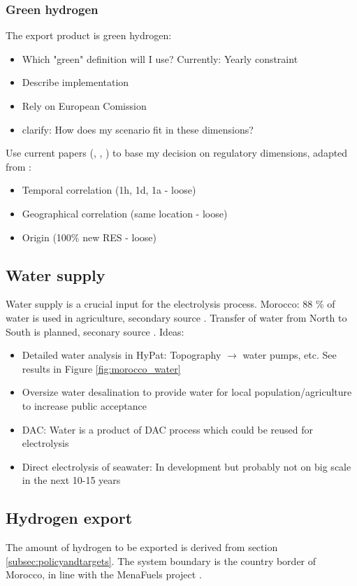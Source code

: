 \subsubsection{Green hydrogen}
The export product is green hydrogen:
\begin{itemize}
    \item Which "green" definition will I use? Currently: Yearly constraint
    \item Describe implementation
    \item Rely on European Comission
    \item clarify: How does my scenario fit in these dimensions?
\end{itemize}

Use current papers (\cite{Brauer2022}, \cite{Ruhnau2022}, \cite{Zeyen2022}) to base my decision on
regulatory dimensions, adapted from \cite{Brauer2022}:
\begin{itemize}
    \item Temporal correlation (1h, 1d, 1a - loose) 
    \item Geographical correlation (same location - loose)
    \item Origin (100\% new RES - loose)
\end{itemize}


\subsection{Water supply}
\label{subsec:water_supply}
Water supply is a crucial input for the electrolysis process. 
Morocco: 88 \% of water is used in agriculture, secondary source \cite{Ersoy2022}.
Transfer of water from North to South is planned, seconary source \cite{Ersoy2022}.
Ideas:
\begin{itemize}
    \item Detailed water analysis in HyPat: Topography $\rightarrow$ water pumps, etc. See results in Figure \ref{fig:morocco_water}
    \item Oversize water desalination to provide water for local population/agriculture to increase public acceptance
    \item DAC: Water is a product of DAC process which could be reused for electrolysis
    \item Direct electrolysis of seawater: In development but probably not on big scale in the next 10-15 years
\end{itemize}



\subsection{Hydrogen export}
\label{subsec:hydrogen_export}
The amount of hydrogen to be exported is derived from section \ref{subsec:policyandtargets}.
The system boundary is the country border of Morocco, in 
line with the MenaFuels project \cite{Ersoy2022}.

